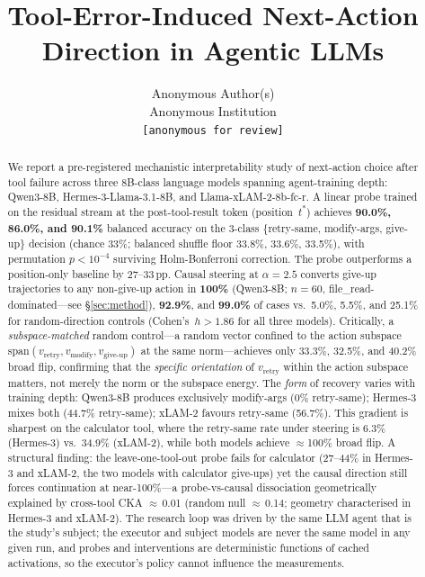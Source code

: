 \documentclass{article}
\title{Tool-Error-Induced Next-Action Direction in Agentic LLMs}
\author{Anonymous Author(s) \\ Anonymous Institution \\ \texttt{[anonymous for review]}}
\begin{document}
\maketitle

\begin{abstract}
We report a pre-registered mechanistic interpretability study of
next-action choice after tool failure across three 8B-class language
models spanning agent-training depth: Qwen3-8B, Hermes-3-Llama-3.1-8B,
and Llama-xLAM-2-8b-fc-r.
A linear probe trained on the residual stream at the post-tool-result
token (position~$t^*$) achieves \textbf{90.0\%, 86.0\%, and 90.1\%}
balanced accuracy on the 3-class \{retry-same, modify-args, give-up\}
decision (chance 33\%; balanced shuffle floor 33.8\%, 33.6\%, 33.5\%),
with permutation $p<10^{-4}$ surviving Holm-Bonferroni correction.
The probe outperforms a position-only baseline by 27--33\,pp.
Causal steering at $\alpha{=}2.5$ converts give-up trajectories to
any non-give-up action in \textbf{100\%} (Qwen3-8B; $n{=}60$,
file\_read-dominated---see \S\ref{sec:method}), \textbf{92.9\%}, and
\textbf{99.0\%} of cases vs.\ 5.0\%, 5.5\%, and 25.1\% for
random-direction controls (Cohen's~$h>1.86$ for all three models).
Critically, a \emph{subspace-matched} random control---a random vector
confined to the action subspace span$(v_{\text{retry}},v_{\text{modify}},
v_{\text{give-up}})$ at the same norm---achieves only 33.3\%, 32.5\%, and
40.2\% broad flip, confirming that the \emph{specific orientation} of
$v_{\text{retry}}$ within the action subspace matters, not merely the
norm or the subspace energy.
The \emph{form} of recovery varies with training depth: Qwen3-8B
produces exclusively modify-args (0\% retry-same); Hermes-3 mixes both
(44.7\% retry-same); xLAM-2 favours retry-same (56.7\%).
This gradient is sharpest on the calculator tool, where the
retry-same rate under steering is 6.3\% (Hermes-3) vs.\ 34.9\%
(xLAM-2), while both models achieve $\approx$100\% broad flip.
A structural finding: the leave-one-tool-out probe fails for
calculator (27--44\% in Hermes-3 and xLAM-2, the two models with
calculator give-ups) yet the causal direction still forces continuation
at near-100\%---a probe-vs-causal dissociation geometrically explained
by cross-tool CKA $\approx$\,0.01 (random null $\approx$\,0.14;
geometry characterised in Hermes-3 and xLAM-2).
The research loop was driven by the same LLM agent that is the
study's subject; the executor and subject models are never the same
model in any given run, and probes and interventions are deterministic
functions of cached activations, so the executor's policy cannot
influence the measurements.
\end{abstract}
\end{document}
